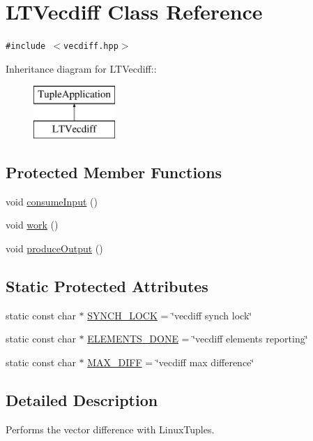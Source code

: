 \hypertarget{class_l_t_vecdiff}{
\section{LTVecdiff Class Reference}
\label{class_l_t_vecdiff}
}
{\tt \#include $<$vecdiff.hpp$>$}

Inheritance diagram for LTVecdiff::\begin{figure}[H]
\begin{center}
\leavevmode
\includegraphics[height=2cm]{class_l_t_vecdiff}
\end{center}
\end{figure}
\subsection*{Protected Member Functions}
\begin{CompactItemize}
\item 
void \hyperlink{class_l_t_vecdiff_9daf31de467c9694e59b55936780dce8}{consumeInput} ()
\item 
void \hyperlink{class_l_t_vecdiff_0117017e12284b1eb57532ca447684f6}{work} ()
\item 
void \hyperlink{class_l_t_vecdiff_69d3c6e3c51052522d474cc75d11a2f2}{produceOutput} ()
\end{CompactItemize}
\subsection*{Static Protected Attributes}
\begin{CompactItemize}
\item 
static const char $\ast$ \hyperlink{class_l_t_vecdiff_251e456901f73b685b41a3826c3a5f8c}{SYNCH\_\-LOCK} = \char`\"{}vecdiff synch lock\char`\"{}
\item 
static const char $\ast$ \hyperlink{class_l_t_vecdiff_552dd71094bbdd099775890405a05221}{ELEMENTS\_\-DONE} = \char`\"{}vecdiff elements reporting\char`\"{}
\item 
static const char $\ast$ \hyperlink{class_l_t_vecdiff_4eecee406e18ced8eef15dfc074d9a55}{MAX\_\-DIFF} = \char`\"{}vecdiff max difference\char`\"{}
\end{CompactItemize}


\subsection{Detailed Description}
Performs the vector difference with LinuxTuples. 

